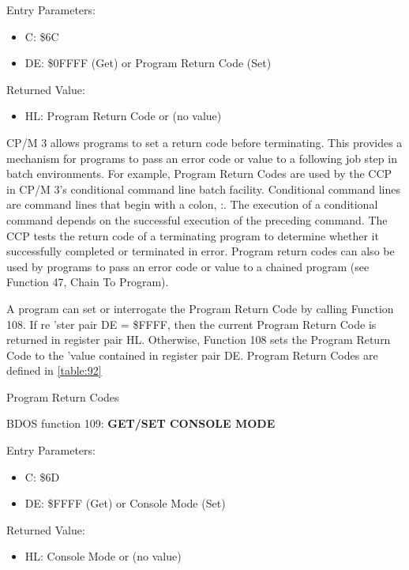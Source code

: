 Entry Parameters:
\begin{itemize}
\item[] C: \$6C
\item[] DE: \$0FFFF (Get) or Program Return Code (Set)
\end{itemize}

Returned Value:
\begin{itemize}
\item[] HL: Program Return Code or (no value)
\end{itemize}

CP/M 3 allows programs to set a return code before terminating. This
provides a mechanism for programs to pass an error code or value to a
following job step in batch environments. For example, Program Return
Codes are used by the CCP in CP/M 3's conditional command line batch
facility. Conditional command lines are command lines that begin with
a colon, :. The execution of a conditional command depends on the
successful execution of the preceding command. The CCP tests the
return code of a terminating program to determine whether it
successfully completed or terminated in error. Program return codes
can also be used by programs to pass an error code or value to a
chained program (see Function 47, Chain To Program).

A program can set or interrogate the Program Return Code by calling
Function 108. If re 'ster pair DE = \$FFFF, then the current Program
Return Code is returned in register pair HL. Otherwise, Function 108
sets the Program Return Code to the 'value contained in register pair
DE. Program Return Codes are defined in \ref{table:92}

\begin{table}[ht]\centering
  \caption{Program Return Codes}
  \label{table:92}
\end{table}

BDOS function 109: \textbf{GET/SET CONSOLE MODE}

Entry Parameters:
\begin{itemize}
\item[] C: \$6D
\item[] DE: \$FFFF (Get) or Console Mode (Set)
\end{itemize}

Returned Value:
\begin{itemize}
\item[] HL: Console Mode or (no value)
\end{itemize}


